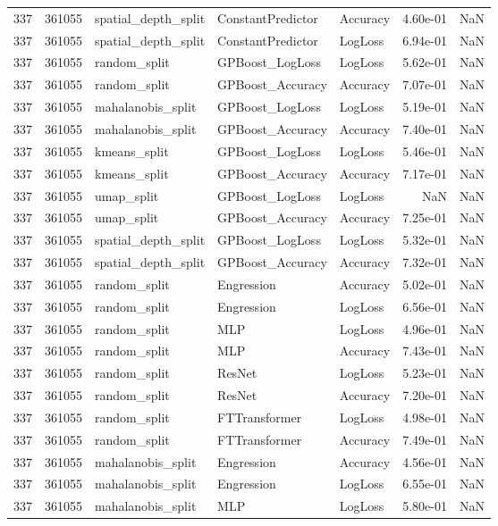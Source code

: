 \begin{tabular}{rrlllrr}
337 & 361055 & spatial\_depth\_split & ConstantPredictor & Accuracy & 4.60e-01 & NaN \\
337 & 361055 & spatial\_depth\_split & ConstantPredictor & LogLoss & 6.94e-01 & NaN \\
337 & 361055 & random\_split & GPBoost\_LogLoss & LogLoss & 5.62e-01 & NaN \\
337 & 361055 & random\_split & GPBoost\_Accuracy & Accuracy & 7.07e-01 & NaN \\
337 & 361055 & mahalanobis\_split & GPBoost\_LogLoss & LogLoss & 5.19e-01 & NaN \\
337 & 361055 & mahalanobis\_split & GPBoost\_Accuracy & Accuracy & 7.40e-01 & NaN \\
337 & 361055 & kmeans\_split & GPBoost\_LogLoss & LogLoss & 5.46e-01 & NaN \\
337 & 361055 & kmeans\_split & GPBoost\_Accuracy & Accuracy & 7.17e-01 & NaN \\
337 & 361055 & umap\_split & GPBoost\_LogLoss & LogLoss & NaN & NaN \\
337 & 361055 & umap\_split & GPBoost\_Accuracy & Accuracy & 7.25e-01 & NaN \\
337 & 361055 & spatial\_depth\_split & GPBoost\_LogLoss & LogLoss & 5.32e-01 & NaN \\
337 & 361055 & spatial\_depth\_split & GPBoost\_Accuracy & Accuracy & 7.32e-01 & NaN \\
337 & 361055 & random\_split & Engression & Accuracy & 5.02e-01 & NaN \\
337 & 361055 & random\_split & Engression & LogLoss & 6.56e-01 & NaN \\
337 & 361055 & random\_split & MLP & LogLoss & 4.96e-01 & NaN \\
337 & 361055 & random\_split & MLP & Accuracy & 7.43e-01 & NaN \\
337 & 361055 & random\_split & ResNet & LogLoss & 5.23e-01 & NaN \\
337 & 361055 & random\_split & ResNet & Accuracy & 7.20e-01 & NaN \\
337 & 361055 & random\_split & FTTransformer & LogLoss & 4.98e-01 & NaN \\
337 & 361055 & random\_split & FTTransformer & Accuracy & 7.49e-01 & NaN \\
337 & 361055 & mahalanobis\_split & Engression & Accuracy & 4.56e-01 & NaN \\
337 & 361055 & mahalanobis\_split & Engression & LogLoss & 6.55e-01 & NaN \\
337 & 361055 & mahalanobis\_split & MLP & LogLoss & 5.80e-01 & NaN \\

\end{tabular}
